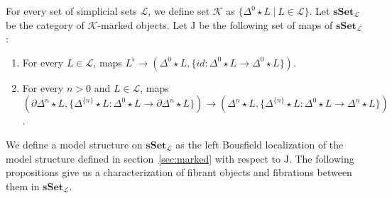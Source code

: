 \documentclass[reqno]{amsart}
\theoremstyle{definition}
\theoremstyle{remark}
\newcommand{\cat}[1]{\mathbf{#1}}
\newcommand{\sSet}{\cat{sSet}}
\newcommand{\K}{$\mathcal{K}$}
\newcommand{\join}{\star}
\newcommand{\J}{\mathrm{J}}
\numberwithin{figure}{section}
\begin{document}
For every set of simplicial sets $\mathcal{L}$, we define set $\mathcal{K}$ as $\{ \Delta^0 \join L\ |\ L \in \mathcal{L} \}$.
Let $\sSet_\mathcal{L}$ be the category of \K-marked objects.
Let $\J$ be the following set of maps of $\sSet_\mathcal{L}$:
\begin{enumerate}
\item For every $L \in \mathcal{L}$, maps $L^\flat \to (\Delta^0 \join L, \{ id : \Delta^0 \join L \to \Delta^0 \join L \})$.
\item For every $n > 0$ and $L \in \mathcal{L}$, maps $(\partial \Delta^n \join L, \{ \Delta^{\{n\}} \join L : \Delta^0 \join L \to \partial \Delta^n \join L \}) \to (\Delta^n \join L, \{ \Delta^{\{n\}} \join L : \Delta^0 \join L \to \Delta^n \join L \})$.
\end{enumerate}
We define a model structure on $\sSet_\mathcal{L}$ as the left Bousfield localization of the model structure defined in section~\ref{sec:marked} with respect to $\J$.
The following propositions give us a characterization of fibrant objects and fibrations between them in $\sSet_\mathcal{L}$.

\begin{comment}
Let $\J'$ be the set of maps of $\sSet_\mathcal{L}$ which consists of the maps in $\J$ and the following maps:
\begin{enumerate}
\item For every $0 < i < n$, inclusions $(\Lambda^n_i)^\flat \to (\Delta^n)^\flat$.
\item For every $L \in \mathcal{L}$, maps $(S,\{ f_1 \}) \to (S,\{ f_0, f_1 \})$, where
\[ S = \Delta^1 \join L \amalg_{\Delta^1} N(\{ 0 \cong 1 \}), \]
$\{ 0 \cong 1 \}$ is the groupoid with two objects and a unique isomorphism between them, and
$f_i$ is the composite $\Delta^0 \join L \xrightarrow{\Delta^{\{i\}} \join L} \Delta^1 \join L \to S$.
\end{enumerate}
\end{comment}
\end{document}
